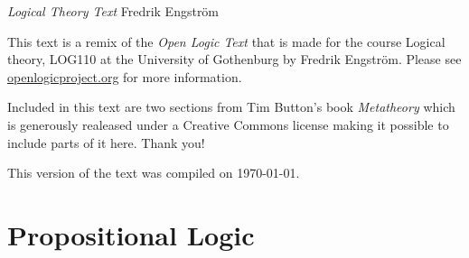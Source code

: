 \documentclass[b5paper]{memoir}
\begin{document}

\begin{titlingpage}

\vfill


\oluselicense
{\textit{Logical Theory Text}}
{Fredrik Engstr\"om}
\end{titlingpage}

\frontmatter
\pagestyle{ruled}

\thispagestyle{empty}%
\noindent This text is a remix of the \textit{Open Logic Text} that is made for the course Logical theory, LOG110 at the University of Gothenburg by Fredrik Engstr\"om. Please see \href{http://openlogicproject.org/}{openlogicproject.org} for
more information. 

Included in this text are two sections from Tim Button's book \textit{Metatheory} which is generously realeased under a Creative Commons license making it possible to include parts of it here. Thank you!


This version of the text was compiled on \today.  
	

\tableofcontents*

\mainmatter




\part{Propositional Logic}
\end{document}

